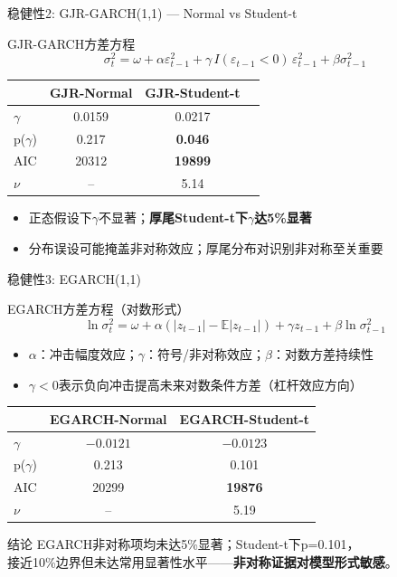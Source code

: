 \documentclass[10pt,aspectratio=169]{beamer}
\begin{document}
\begin{frame}{稳健性2: GJR-GARCH(1,1) — Normal vs Student-t}
  \begin{block}{GJR-GARCH方差方程}
    \[
    \sigma_t^2 = \omega + \alpha \varepsilon_{t-1}^2 + \gamma\,I(\varepsilon_{t-1}<0)\,\varepsilon_{t-1}^2 + \beta \sigma_{t-1}^2
    \]
  \end{block}
  \begin{table}
    \centering
    \begin{tabular}{lccc}
      \toprule
      & GJR-Normal & GJR-Student-t \\
      \midrule
      $\gamma$ & 0.0159 & 0.0217 \\
      p($\gamma$) & 0.217 & \textbf{0.046} \\
      AIC & 20312 & \textbf{19899} \\
      $\nu$ & -- & 5.14 \\
      \bottomrule
    \end{tabular}
  \end{table}
  \begin{itemize}
    \item 正态假设下$\gamma$不显著；\textbf{厚尾Student-t下$\gamma$达5\%显著}
    \item 分布误设可能掩盖非对称效应；厚尾分布对识别非对称至关重要
  \end{itemize}
\end{frame}

\begin{frame}{稳健性3: EGARCH(1,1)}
  \begin{block}{EGARCH方差方程（对数形式）}
    \[
    \ln\sigma_t^2 = \omega + \alpha(|z_{t-1}|-\mathbb{E}|z_{t-1}|) + \gamma z_{t-1} + \beta\ln\sigma_{t-1}^2
    \]
  \end{block}
  \begin{itemize}
    \item $\alpha$：冲击幅度效应；$\gamma$：符号/非对称效应；$\beta$：对数方差持续性
    \item $\gamma<0$表示负向冲击提高未来对数条件方差（杠杆效应方向）
  \end{itemize}
  \begin{table}
    \centering
    \begin{tabular}{lcc}
      \toprule
      & EGARCH-Normal & EGARCH-Student-t \\
      \midrule
      $\gamma$ & $-0.0121$ & $-0.0123$ \\
      p($\gamma$) & 0.213 & 0.101 \\
      AIC & 20299 & \textbf{19876} \\
      $\nu$ & -- & 5.19 \\
      \bottomrule
    \end{tabular}
  \end{table}
  \begin{block}{结论}
    EGARCH非对称项均未达5\%显著；Student-t下p=0.101，\\
    接近10\%边界但未达常用显著性水平——\textbf{非对称证据对模型形式敏感}。
  \end{block}
\end{frame}
\end{document}
